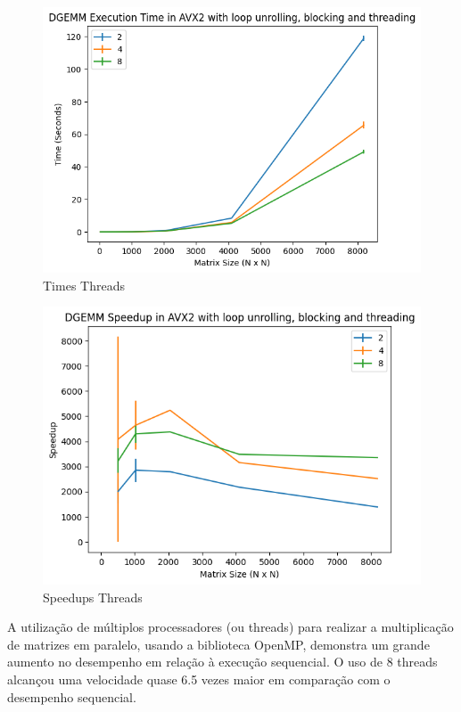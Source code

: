 \documentclass[12pt]{article}
\begin{document}
\begin{figure}[h]
    \centering
    \includegraphics[scale=0.6]{figures/times_threads.png}
    \caption{Times Threads}
    \label{fig:times-threads}
\end{figure}

\begin{figure}[h]
    \centering
    \includegraphics[scale=0.6]{figures/speedups_threads.png}
    \caption{Speedups Threads}
    \label{fig:speedups-threads}
\end{figure}

A utilização de múltiplos processadores (ou threads) para realizar a multiplicação de matrizes em paralelo, usando a biblioteca OpenMP, demonstra um grande aumento no desempenho em relação à execução sequencial. O uso de 8 threads alcançou uma velocidade quase 6.5 vezes maior em comparação com o desempenho sequencial.
\end{document}
